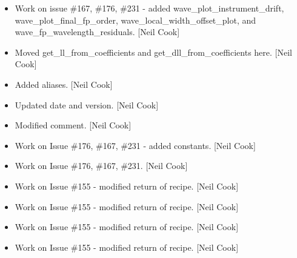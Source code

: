 \documentclass[a4paper,10pt,english]{report}
\begin{document}
\begin{itemize}
\item {} 
Work on issue \#167, \#176, \#231 - added wave\_plot\_instrument\_drift,
wave\_plot\_final\_fp\_order, wave\_local\_width\_offset\_plot, and
wave\_fp\_wavelength\_residuals. {[}Neil Cook{]}

\item {} 
Moved get\_ll\_from\_coefficients and get\_dll\_from\_coefficients here.
{[}Neil Cook{]}

\item {} 
Added aliases. {[}Neil Cook{]}

\item {} 
Updated date and version. {[}Neil Cook{]}

\item {} 
Modified comment. {[}Neil Cook{]}

\item {} 
Work on Issue \#176, \#167, \#231 - added constants. {[}Neil Cook{]}

\item {} 
Work on Issue \#176, \#167, \#231. {[}Neil Cook{]}

\item {} 
Work on Issue \#155 - modified return of recipe. {[}Neil Cook{]}

\item {} 
Work on Issue \#155 - modified return of recipe. {[}Neil Cook{]}

\item {} 
Work on Issue \#155 - modified return of recipe. {[}Neil Cook{]}

\item {} 
Work on Issue \#155 - modified return of recipe. {[}Neil Cook{]}

\end{itemize}
\end{document}
